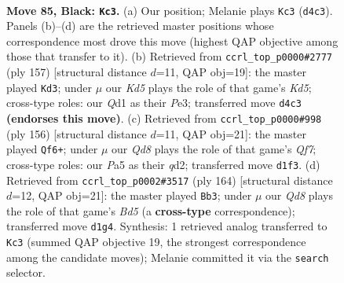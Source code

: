 \documentclass[11pt]{article}
\begin{document}
\clearpage

\begin{figure}[p]\centering
\begin{subfigure}{0.46\textwidth}\centering
\resizebox{\linewidth}{!}{%
\newchessgame
\chessboard[
  setfen={8/8/1p6/p7/2Pk4/K7/8/3q4 b - - 27 85},
  showmover=false,
  pgfstyle=straightmove, color=movearrow, markmove={d4-c3}
]}
\caption{}
\end{subfigure}\hfill
\begin{subfigure}{0.46\textwidth}\centering
\resizebox{\linewidth}{!}{%
\newchessgame
\chessboard[
  setfen={8/8/1P6/8/2Pk4/4pp2/8/4K3 b - - 0 79},
  showmover=false,
  pgfstyle=straightmove, color=movearrow, markmove={d4-d3}
]}
\caption{}
\end{subfigure}
\\[4pt]
\begin{subfigure}{0.46\textwidth}\centering
\resizebox{\linewidth}{!}{%
\newchessgame
\chessboard[
  setfen={8/5Q2/2k5/7K/6p1/8/3q3P/8 w - - 18 79},
  showmover=false,
  pgfstyle=straightmove, color=movearrow, markmove={f7-f6}
]}
\caption{}
\end{subfigure}\hfill
\begin{subfigure}{0.46\textwidth}\centering
\resizebox{\linewidth}{!}{%
\newchessgame
\chessboard[
  setfen={7k/5K2/6p1/3B4/7P/7P/8/8 w - - 9 83},
  showmover=false,
  pgfstyle=straightmove, color=movearrow, markmove={d5-b3}
]}
\caption{}
\end{subfigure}
\caption{\textbf{Move 85, Black: \texttt{Kc3}.} (a) Our position; Melanie plays \texttt{Kc3} (\texttt{d4c3}). Panels (b)--(d) are the retrieved master positions whose correspondence most drove this move (highest QAP objective among those that transfer to it). (b) Retrieved from \texttt{ccrl\_top\_p0000\#2777} (ply 157) [structural distance $d$=11, QAP obj=19]: the master played \texttt{Kd3}; under $\mu$ our \emph{Kd5} plays the role of that game's \emph{Kd5}; cross-type roles: our \emph{Q}d1 as their \emph{P}e3; transferred move \texttt{d4c3} \textbf{(endorses this move)}. (c) Retrieved from \texttt{ccrl\_top\_p0000\#998} (ply 156) [structural distance $d$=11, QAP obj=21]: the master played \texttt{Qf6+}; under $\mu$ our \emph{Qd8} plays the role of that game's \emph{Qf7}; cross-type roles: our \emph{P}a5 as their \emph{q}d2; transferred move \texttt{d1f3}. (d) Retrieved from \texttt{ccrl\_top\_p0002\#3517} (ply 164) [structural distance $d$=12, QAP obj=21]: the master played \texttt{Bb3}; under $\mu$ our \emph{Qd8} plays the role of that game's \emph{Bd5} (a \textbf{cross-type} correspondence); transferred move \texttt{d1g4}. Synthesis: 1 retrieved analog transferred to \texttt{Kc3} (summed QAP objective 19, the strongest correspondence among the candidate moves); Melanie committed it via the \texttt{search} selector.}
\label{fig:thought-m169}
\end{figure}
\end{document}
